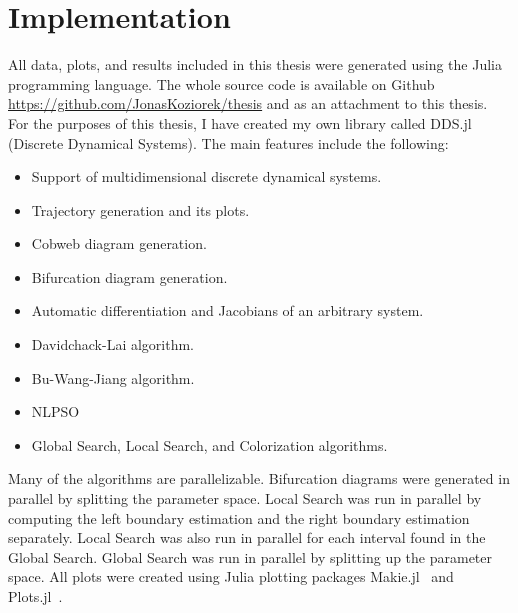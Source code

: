 \section{Implementation}
All data, plots, and results included in this thesis were generated using the Julia programming language.
The whole source code is available on Github \url{https://github.com/JonasKoziorek/thesis} and as an attachment to this thesis.
For the purposes of this thesis, I have created my own library called DDS.jl (Discrete Dynamical Systems).
The main features include the following:
\begin{itemize}
    \item Support of multidimensional discrete dynamical systems.
    \item Trajectory generation and its plots.
    \item Cobweb diagram generation.
    \item Bifurcation diagram generation.
    \item Automatic differentiation and Jacobians of an arbitrary system.
    \item Davidchack-Lai algorithm.
    \item Bu-Wang-Jiang algorithm.
    \item NLPSO
    \item Global Search, Local Search, and Colorization algorithms.
\end{itemize}
Many of the algorithms are parallelizable.
Bifurcation diagrams were generated in parallel by splitting the parameter space.
Local Search was run in parallel by computing the left boundary estimation and the right boundary estimation separately.
Local Search was also run in parallel for each interval found in the Global Search.
Global Search was run in parallel by splitting up the parameter space.
All plots were created using Julia plotting packages Makie.jl~\cite{Danisch2021} and Plots.jl~\cite{Christ2022}.

\endinput